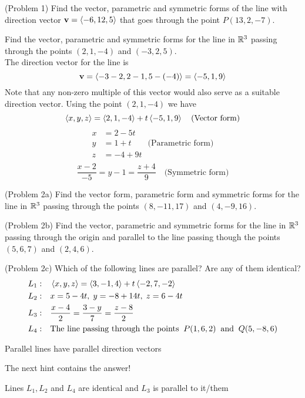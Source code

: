 \documentclass[handout]{ximera}
\begin{document}
\begin{problem}(Problem 1)
Find the vector, parametric and symmetric forms of the line with direction 
vector $\mathbf{v} = \left\langle -6, 12, 5\right\rangle$ that goes through the point $P(13, 2, -7)$. \\
\end{problem}

\begin{example}[Example 2]
Find the vector, parametric and symmetric forms for the line in $\mathbb R^3$ passing 
through the points $(2, 1, -4)$ and $(-3, 2, 5)$.\\
The direction vector for the line is 
\[
\mathbf{v} = \left\langle -3-2, 2-1, 5-(-4)\right\rangle = \left\langle -5, 1, 9\right\rangle
\]
Note that any non-zero multiple of this vector would also serve as a suitable direction vector. 
Using the point $(2, 1, -4)$ we have
\[
\left\langle x, y, z\right\rangle = \left\langle 2, 1, -4\right\rangle + t\left\langle -5, 1, 9\right\rangle \quad \text{(Vector form)}
\]
\begin{align*}
x &= 2 -5t\\
y &= 1 + t \quad\quad\text{(Parametric form)}\\
z &= -4 + 9t\\
\end{align*}
\[
\frac{x-2}{-5} = y-1 = \frac{z+4}{9} \quad \text{(Symmetric form)}
\]
\end{example}

\begin{problem}(Problem 2a)
Find the vector form, parametric form and symmetric forms for the line in $\mathbb R^3$ passing 
through the points $(8, -11, 17)$ and $(4, -9, 16)$.\\
\end{problem}

\begin{problem}(Problem 2b)
Find the vector, parametric and symmetric forms for the line in $\mathbb R^3$ passing through the origin 
and parallel to the line passing though the points $(5, 6, 7)$ and $(2, 4, 6)$.\\
\end{problem}


\begin{problem}(Problem 2c)
Which of the following lines are parallel? Are any of them identical?
\begin{align*}
L_1:&\quad \left\langle x, y, z\right\rangle = \left\langle 3,-1,4\right\rangle + t\left\langle -2,7,-2\right\rangle\\
L_2:& \quad x = 5-4t,\; y = -8+ 14t,\; z = 6-4t\\
L_3:& \quad \frac{x - 4 }{2} = \frac{3 -y}{7}= \frac{z - 8}{2}\\
L_4:&\quad  \text{The line passing through the points} \;\; P(1, 6, 2)\;\; \text{and} \;\; Q(5, -8, 6)
\end{align*}
\begin{hint}
Parallel lines have parallel direction vectors
\end{hint}
\begin{hint}
The next hint contains the answer!
\end{hint}
\begin{hint}
Lines $L_1, L_2$ and $L_4$ are identical and $L_3$ is parallel to it/them
\end{hint}
\end{problem}
\end{document}
